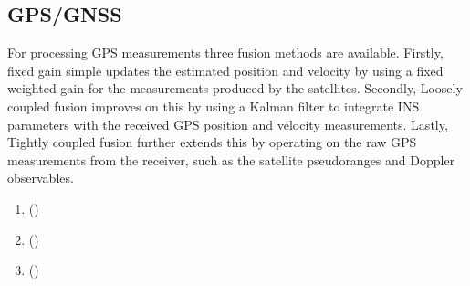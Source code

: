 \documentclass[letterpaper,10pt,english]{sphinxmanual}
\begin{document}
\subsection{GPS/GNSS}
\label{\detokenize{usage/fusion:gps-gnss}}
\sphinxAtStartPar
For processing GPS measurements three fusion methods are available. Firstly, fixed gain simple updates the estimated
position and velocity by using a fixed weighted gain for the measurements produced by the satellites. Secondly, Loosely
coupled fusion improves on this by using a Kalman filter to integrate INS parameters with the received GPS position
and velocity measurements. Lastly, Tightly coupled fusion further extends this by operating on the raw GPS measurements
from the receiver, such as the satellite pseudo\sphinxhyphen{}ranges and Doppler observables.
\begin{enumerate}
%
\item {} 
\sphinxAtStartPar
{\hyperref[\detokenize{modules/gps/fusion:fusion-py}]{}} ()

\item {} 
\sphinxAtStartPar
{\hyperref[\detokenize{modules/gps/fusion:fusion-py}]{}} ()

\item {} 
\sphinxAtStartPar
{\hyperref[\detokenize{modules/gps/fusion:fusion-py}]{}} ()

\end{enumerate}
\end{document}

